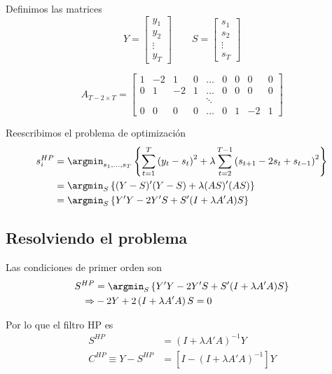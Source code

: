 \documentclass[11pt]{article}
\begin{document}
Definimos las matrices \begin{equation*}
Y = \begin{bmatrix}
y_1 \\
y_2 \\
\vdots \\
y_T
\end{bmatrix}
\qquad
S = \begin{bmatrix}
s_1 \\
s_2 \\
\vdots \\
s_T
\end{bmatrix}
\end{equation*}

\begin{equation*}
A_{T-2\times T} =
\begin{bmatrix}
1 & -2 & 1 & 0 & \dots & 0 & 0 & 0 & 0 \\
0 & 1 & -2 & 1 & \dots & 0 & 0 & 0 & 0 \\
&  &  &  & \ddots &  &  &  &  \\
0 & 0 & 0 & 0 & \dots & 0 & 1 & -2 & 1
\end{bmatrix}
\end{equation*}

Reescribimos el problema de optimización \begin{align*}
    s_i^{HP} &=  \argmin_{s_1,\dots,s_T}\left\{\sum_{t=1}^{T}\left(y_t-s_t\right)^2 +  \lambda \sum_{t=2}^{T-1}\left(s_{t+1}-2s_t + s_{t-1}\right)^2 \right\}\\  
           &= \argmin_{S}\left\{(Y-S)'(Y-S) +  \lambda (AS)'(AS) \right\} \\
           &= \argmin_{S}\left\{Y'Y - 2Y'S +  S'(I + \lambda A'A)S \right\}
\end{align*}

\hypertarget{resolviendo-el-problema}{%
\subsection{Resolviendo el problema}\label{resolviendo-el-problema}}

Las condiciones de primer orden son \begin{align*}
S^{HP} &= \argmin_{S}\left\{Y'Y - 2Y'S +  S'(I + \lambda A'A)S \right\} \\
\Rightarrow & - 2Y + 2\left(I + \lambda A'A\right)S = 0
\end{align*}

Por lo que el filtro HP es \begin{align*}
S^{HP}                 &= \left(I + \lambda A'A\right)^{-1}Y \tag{tendencia} \\
C^{HP} \equiv Y-S^{HP} &= \left[I - \left(I + \lambda A'A\right)^{-1}\right]Y \tag{ciclo}
\end{align*}
\end{document}
